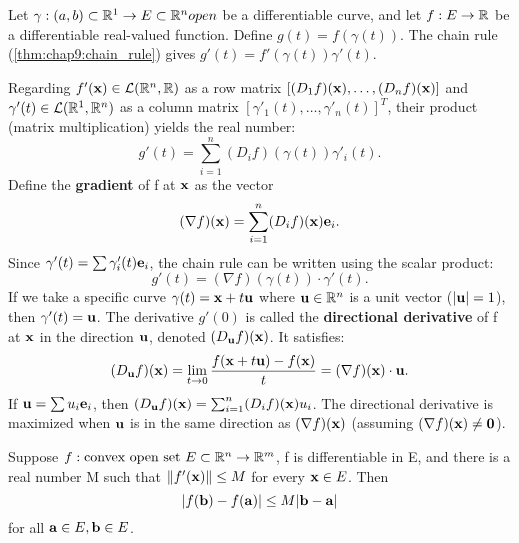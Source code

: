 \begin{example}
  \label{ex:chap9:gradient_directional_deriv}
  Let $\gamma: (a,b) \subset \mathbb{R}^1 \to E \subset \mathbb{R}^n open$ be a
  differentiable curve, and let $f: E \to \mathbb{R}$ be a differentiable
  real-valued function. Define $g(t) = f(\gamma(t))$. The chain rule
  (\ref{thm:chap9:chain_rule}) gives $g'(t) = f'(\gamma(t))\gamma'(t)$.

  Regarding $f'(\mathbf{x}) \in \mathcal{L}(\mathbb{R}^n, \mathbb{R})$ as a row matrix
  $[ (D_1 f)(\mathbf{x}), \dots, (D_n f)(\mathbf{x}) ]$ and $\gamma'(t)
  \in \mathcal{L}(\mathbb{R}^1, \mathbb{R}^n)$ as a column matrix $[\gamma'_1(t),
  \dots, \gamma'_n(t)]^T$, their product (matrix multiplication)
  yields the real number:
  \begin{equation*} %
    g'(t) = \sum_{i=1}^n (D_i f)(\gamma(t)) \gamma'_i(t).
  \end{equation*}
  Define the \textbf{gradient} of f at $\mathbf{x}$ as the vector
  \begin{equation*} %
    (\nabla f)(\vect{x}) = \sum_{i=1}^n (D_i f)(\vect{x}) \vect{e}_i.
  \end{equation*}
  Since $\gamma'(t) = \sum \gamma'_i(t) \mathbf{e}_i$, the chain rule
  can be written using the scalar product:
  \begin{equation*} %
    g'(t) = (\nabla f)(\gamma(t)) \cdot \gamma'(t).
  \end{equation*}
  If we take a specific curve $\gamma(t) = \mathbf{x} + t\mathbf{u}$
  where $\mathbf{u} \in \mathbb{R}^n$ is a unit vector ($|\mathbf{u}|=1$), then
  $\gamma'(t) = \mathbf{u}$. The derivative $g'(0)$ is called the
  \textbf{directional derivative} of f at $\mathbf{x}$ in the direction
  $\mathbf{u}$, denoted $(D_{\mathbf{u}}f)(\mathbf{x})$. It satisfies:
  \begin{equation*} %
    (D_{\vect{u}}f)(\vect{x}) = \lim_{t \to 0} \frac{f(\vect{x} +
    t\vect{u}) - f(\vect{x})}{t} = (\nabla f)(\vect{x}) \cdot \vect{u}.
  \end{equation*}
  If $\mathbf{u} = \sum u_i \mathbf{e}_i$, then
  $(D_{\mathbf{u}}f)(\mathbf{x}) = \sum_{i=1}^n (D_i f)(\mathbf{x}) u_i$.
  The directional derivative is maximized when $\mathbf{u}$ is in the
  same direction as $(\nabla f)(\mathbf{x})$ (assuming $(\nabla
  f)(\mathbf{x}) \ne \mathbf{0}$).
\end{example}

\begin{theorem}
  \label{thm:chap9:mean_value_thm_vector}
  Suppose $f: \text{convex open set } E \subset \mathbb{R}^n \to \mathbb{R}^m$, f
  is differentiable in E, and there is a real number M such that
  $\left\lVert f'(\mathbf{x}) \right\rVert \le M$ for every $\mathbf{x} \in E$. Then
  \[
    |f(\mathbf{b}) - f(\mathbf{a})| \le M |\mathbf{b} - \mathbf{a}|
  \]
  for all $\mathbf{a} \in E, \mathbf{b} \in E$.
\end{theorem}


